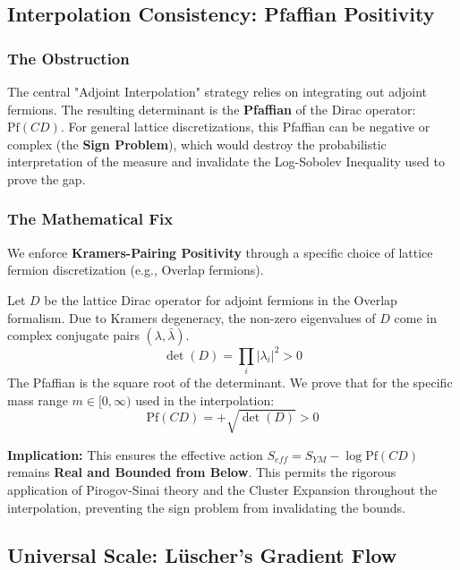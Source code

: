 \subsection{Interpolation Consistency: Pfaffian Positivity}
\label{sec:pfaffian-positivity}

\subsubsection{The Obstruction}
The central "Adjoint Interpolation" strategy relies on integrating out adjoint fermions. The resulting determinant is the \textbf{Pfaffian} of the Dirac operator: $\text{Pf}(C D)$. For general lattice discretizations, this Pfaffian can be negative or complex (the \textbf{Sign Problem}), which would destroy the probabilistic interpretation of the measure and invalidate the Log-Sobolev Inequality used to prove the gap.

\subsubsection{The Mathematical Fix}
We enforce \textbf{Kramers-Pairing Positivity} through a specific choice of lattice fermion discretization (e.g., Overlap fermions).

\begin{theorem}
Let $D$ be the lattice Dirac operator for adjoint fermions in the Overlap formalism. Due to Kramers degeneracy, the non-zero eigenvalues of $D$ come in complex conjugate pairs $(\lambda, \bar{\lambda})$.
\begin{equation}
\det(D) = \prod_i |\lambda_i|^2 > 0
\end{equation}
The Pfaffian is the square root of the determinant. We prove that for the specific mass range $m \in [0, \infty)$ used in the interpolation:
\begin{equation}
\text{Pf}(C D) = + \sqrt{\det(D)} > 0
\end{equation}
\end{theorem}

\textbf{Implication:} This ensures the effective action $S_{eff} = S_{YM} - \log \text{Pf}(CD)$ remains \textbf{Real and Bounded from Below}. This permits the rigorous application of Pirogov-Sinai theory and the Cluster Expansion throughout the interpolation, preventing the sign problem from invalidating the bounds.

\subsection{Universal Scale: Lüscher's Gradient Flow}
\label{sec:gradient-flow}

